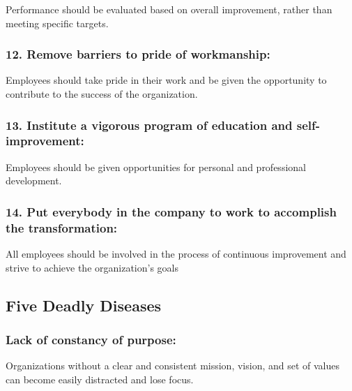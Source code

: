 \documentclass[11pt]{article}
\begin{document}
Performance should be evaluated based on overall improvement, rather
than meeting specific targets.

\hypertarget{remove-barriers-to-pride-of-workmanship}{%
\subsubsection{12. Remove barriers to pride of
workmanship:}\label{remove-barriers-to-pride-of-workmanship}}

Employees should take pride in their work and be given the opportunity
to contribute to the success of the organization.

\hypertarget{institute-a-vigorous-program-of-education-and-self-improvement}{%
\subsubsection{13. Institute a vigorous program of education and
self-improvement:}\label{institute-a-vigorous-program-of-education-and-self-improvement}}

Employees should be given opportunities for personal and professional
development.

\hypertarget{put-everybody-in-the-company-to-work-to-accomplish-the-transformation}{%
\subsubsection{14. Put everybody in the company to work to accomplish
the
transformation:}\label{put-everybody-in-the-company-to-work-to-accomplish-the-transformation}}

All employees should be involved in the process of continuous
improvement and strive to achieve the organization's goals

\hypertarget{five-deadly-diseases}{%
\subsection{Five Deadly Diseases}\label{five-deadly-diseases}}

\hypertarget{lack-of-constancy-of-purpose}{%
\subsubsection{Lack of constancy of
purpose:}\label{lack-of-constancy-of-purpose}}

Organizations without a clear and consistent mission, vision, and set of
values can become easily distracted and lose focus.
\end{document}
